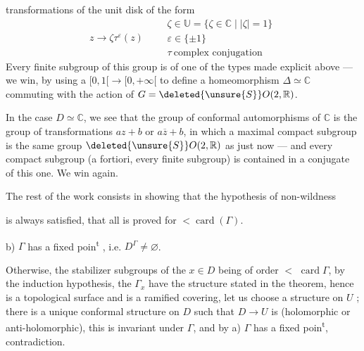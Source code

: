 

transformations of the unit disk of the form
\[
z\longrightarrow\zeta\tau^\varepsilon(z)\qquad
\begin{gathered}
\zeta\in\mathbb U=\{\zeta\in\mathbb C\mid |\zeta|=1\}\\
\varepsilon\in\{\pm1\}\\
\tau\ \text{complex conjugation}
\end{gathered}
\]
Every finite subgroup of this group is of one of the types made explicit above --- we win, by using a  $[0,1[\longrightarrow[0,+\infty[$ to define a homeomorphism  $\Delta\simeq\mathbb C$ commuting with the action of $G=\deleted{\unsure{S}}O(2,\mathbb R)$.

In the case $D\simeq\mathbb C$, we see that  the group of conformal automorphisms of $\mathbb C$ is the group of transformations $az+b$ or $a\overline z+b$, in which a maximal compact subgroup is the same group $\deleted{\unsure{S}}O(2,\mathbb R)$ as just now --- and every compact subgroup (a fortiori, every finite subgroup) is contained in a conjugate of this one. We win again.

The rest of the work consists  in  showing that the hypothesis of non-wildness



is always satisfied,    that all is proved for   $<\operatorname{card}(\Gamma)$. 

 b) $\Gamma$ has a fixed poin\textsuperscript{t} , i.e. $D^\Gamma\ne\varnothing$.

Otherwise, the stabilizer subgroups  of the $x\in D$ being of order $<$  $\operatorname{card}\Gamma$, by the induction hypothesis, the $\Gamma_x$ have the structure stated in the theorem, hence  is a topological surface and  is a ramified covering, let us choose a   structure on $U$ ; there is a unique conformal structure on $D$ such that $D\longrightarrow U$ is   (holomorphic or anti-holomorphic), this is invariant under $\Gamma$, and by a) $\Gamma$ has a fixed poin\textsuperscript{t}, contradiction.

